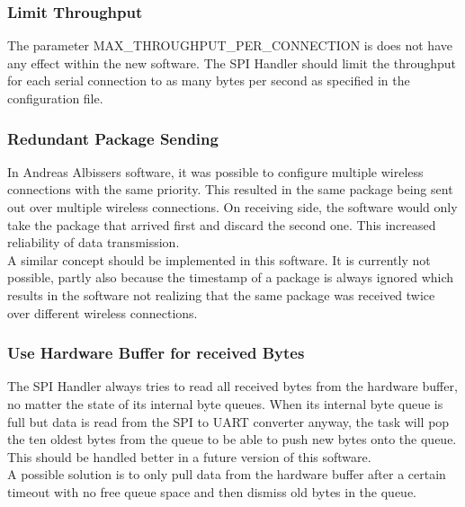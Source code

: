 \subsubsection{Limit Throughput}
The parameter MAX\_THROUGHPUT\_PER\_CONNECTION is does not have any effect within the new software. The SPI Handler should limit the throughput for each serial connection to as many bytes per second as specified in the configuration file.\\
%
\subsubsection{Redundant Package Sending}
In Andreas Albissers software, it was possible to configure multiple wireless connections with the same priority. This resulted in the same package being sent out over multiple wireless connections. On receiving side, the software would only take the package that arrived first and discard the second one. This increased reliability of data transmission.\\
A similar concept should be implemented in this software. It is currently not possible, partly also because the timestamp of a package is always ignored which results in the software not realizing that the same package was received twice over different wireless connections.
%
\subsubsection{Use Hardware Buffer for received Bytes}
The SPI Handler always tries to read all received bytes from the hardware buffer, no matter the state of its internal byte queues. When its internal byte queue is full but data is read from the SPI to UART converter anyway, the task will pop the ten oldest bytes from the queue to be able to push new bytes onto the queue. \\
This should be handled better in a future version of this software.\\
A possible solution is to only pull data from the hardware buffer after a certain timeout with no free queue space and then dismiss old bytes in the queue.
%
